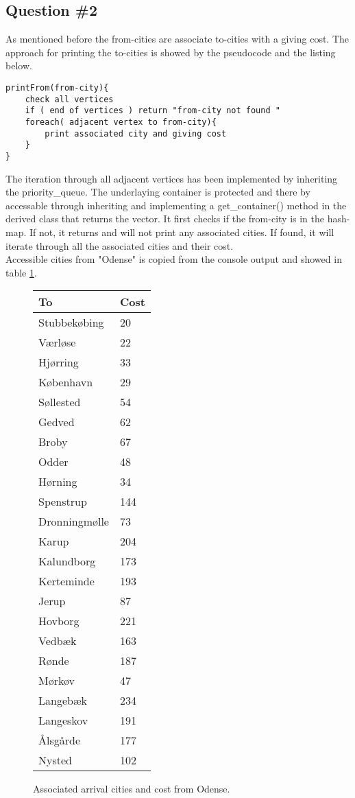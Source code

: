 \subsection{Question \#2}
As mentioned before the from-cities are associate to-cities with a giving cost. The approach for printing the to-cities is showed by the pseudocode and the listing below. 
\bigskip
\begin{lstlisting}
printFrom(from-city){
	check all vertices 
	if ( end of vertices ) return "from-city not found "
	foreach( adjacent vertex to from-city){
	    print associated city and giving cost
    }
}
\end{lstlisting}
The iteration through all adjacent vertices has been implemented by inheriting the priority_queue. The underlaying container is protected and there by accessable through inheriting and implementing a get_container() method in the derived class that returns the vector.
\bigskip
It first checks if the from-city is in the hash-map. If not, it returns and will not print any associated cities. If found, it will iterate through all the associated cities and their cost.\\
Accessible cities from "Odense" is copied from the console output and showed in table \ref{tb:fromodense}. 
\begin{figure}[th!]
\centering
\begin{tabular}{l|l}
To &Cost\\\hline
Stubbekøbing & 20\\
Værløse & 22\\
Hjørring & 33\\
København & 29\\
Søllested & 54\\
Gedved & 62\\
Broby & 67\\
Odder & 48\\
Hørning & 34\\
Spenstrup & 144\\
Dronningmølle & 73\\
Karup & 204\\
Kalundborg & 173\\
Kerteminde & 193\\
Jerup & 87\\
Hovborg & 221\\
Vedbæk & 163\\
Rønde & 187\\
Mørkøv & 47\\
Langebæk & 234\\
Langeskov & 191\\
Ålsgårde & 177\\
Nysted & 102\\
\end{tabular}
\captionsetup{type=table}
\caption[tekst i indholdsfortegnelsen]{Associated arrival cities and cost from Odense.}
\label{tb:fromodense}
\end{figure}

